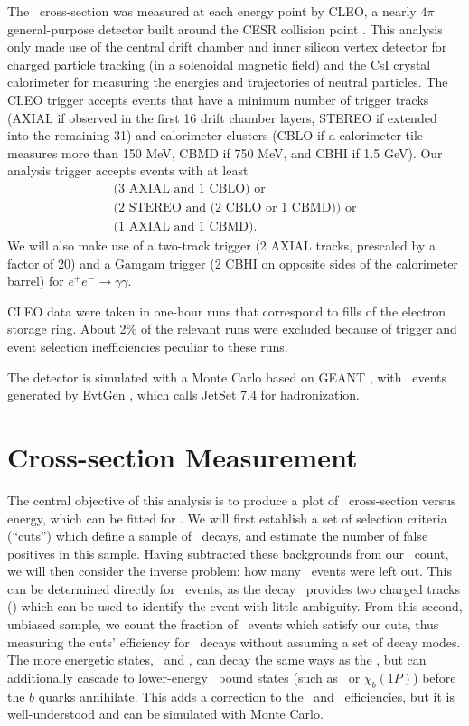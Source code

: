 \documentclass[aps,prd,preprint,superscriptaddress,tightenlines,nofootinbib,floatfix]{revtex4}
\begin{document}
The \ups\ cross-section was measured at each energy point by CLEO, a
nearly $4\pi$ general-purpose detector built around the CESR collision
point \cite{cleo}.  This analysis only made use of the central drift chamber and
inner silicon vertex detector for charged particle tracking (in a
solenoidal magnetic field) and the CsI crystal calorimeter for
measuring the energies and trajectories of neutral particles.  The
CLEO trigger accepts events that have a minimum number of trigger
tracks (AXIAL if observed in the first 16 drift chamber layers, STEREO
if extended into the remaining 31) and calorimeter clusters (CBLO if a
calorimeter tile measures more than 150 MeV, CBMD if 750 MeV, and CBHI
if 1.5 GeV).  Our analysis trigger accepts events with at least
\begin{multline}
  \mbox{(3 AXIAL and 1 CBLO) or} \\
  \mbox{(2 STEREO and (2 CBLO or 1 CBMD)) or} \\
  \mbox{(1 AXIAL and 1 CBMD).} \label{eqn:trig}
\end{multline}
We will also make use of a two-track trigger (2 AXIAL tracks,
prescaled by a factor of 20) and a Gamgam trigger (2 CBHI on opposite
sides of the calorimeter barrel) for $e^+e^- \to \gamma\gamma$.

CLEO data were taken in one-hour runs that correspond to fills of the
electron storage ring.  About 2\% of the relevant runs were excluded
because of trigger and event selection inefficiencies peculiar to
these runs.

The detector is simulated with a Monte Carlo based on GEANT \cite{geant}, with
\ups\ events generated by EvtGen \cite{evtgen}, which calls JetSet 7.4 \cite{jetset} for
hadronization.

%
\section{Cross-section Measurement}
%

The central objective of this analysis is to produce a plot of \ups\
cross-section versus energy, which can be fitted for \gee.  We will
first establish a set of selection criteria (``cuts'') which define a
sample of \ups\ decays, and estimate the number of false positives in
this sample.  Having subtracted these backgrounds from our \ups\
count, we will then consider the inverse problem: how many \ups\
events were left out.  This can be determined directly for \uone\
events, as the decay \twotoone\ provides two charged tracks (\pip)
which can be used to identify the event with little ambiguity.  From
this second, unbiased sample, we count the fraction of \uone\ events
which satisfy our cuts, thus measuring the cuts' efficiency for \uone\
decays without assuming a set of decay modes.  The more energetic
states, \utwo\ and \uthree, can decay the same ways as the \uone, but
can additionally cascade to lower-energy \bbar\ bound states (such as
\uone\ or $\chi_b(1P)$) before the $b$ quarks annihilate.  This adds a
correction to the \utwo\ and \uthree\ efficiencies, but it is
well-understood and can be simulated with Monte Carlo.
\end{document}
